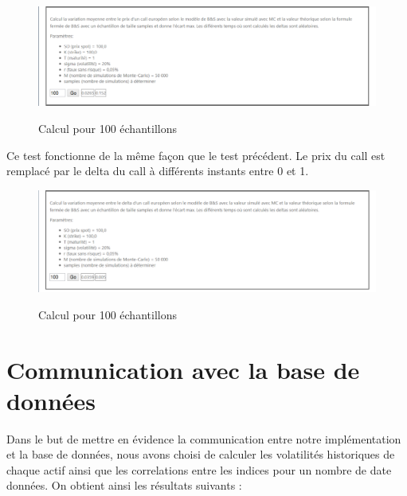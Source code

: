 \documentclass[french,12pt,a4paper]{article}
\begin{document}
\begin{center}
\begin{figure}[h!]
    \caption{Calcul pour 100 échantillons}
    \includegraphics[scale=0.45]{../test3.png}
    \label{fig:PropProf}
\end{figure}
\end{center}

Ce test fonctionne de la même façon que le test précédent. Le prix du call est remplacé par le delta du call à différents instants entre 0 et 1.
\begin{center}
\begin{figure}[h!]
    \caption{Calcul pour 100 échantillons}
    \includegraphics[scale=0.45]{../test4.png}
    \label{fig:PropProf}
\end{figure}
\end{center}


\section{Communication avec la base de données}

Dans le but de mettre en évidence la communication entre notre implémentation et la base de données, nous avons choisi de calculer les volatilités historiques de chaque actif ainsi que les correlations entre les indices pour un nombre de date données. On obtient ainsi les résultats suivants :
\end{document}
